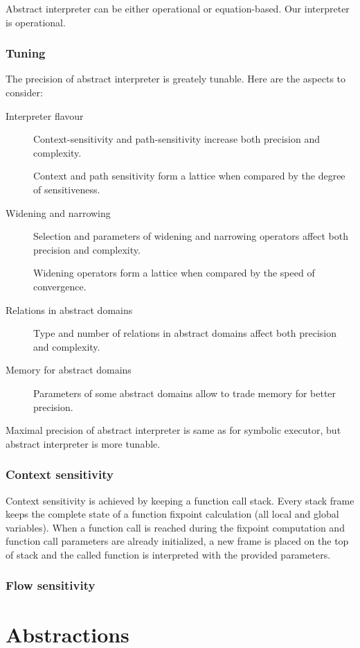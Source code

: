 \documentclass[a4paper]{book}
\begin{document}
Abstract interpreter can be either operational or equation-based.  Our
interpreter is operational.

\subsection{Tuning}
The precision of abstract interpreter is greately tunable. Here are
the aspects to consider:
\begin{description}
\item[Interpreter flavour] Context-sensitivity and path-sensitivity
  increase both precision and complexity.

Context and path sensitivity form a lattice when compared by the
degree of sensitiveness.

\item[Widening and narrowing] Selection and parameters of widening and
  narrowing operators affect both precision and complexity.

Widening operators form a lattice when compared by the speed of
convergence.

\item[Relations in abstract domains] Type and number of relations in
  abstract domains affect both precision and complexity.
\item[Memory for abstract domains] Parameters of some abstract domains
  allow to trade memory for better precision.
\end{description}

Maximal precision of abstract interpreter is same as for symbolic
executor, but abstract interpreter is more tunable.

\subsection{Context sensitivity}
Context sensitivity is achieved by keeping a function call stack.
Every stack frame keeps the complete state of a function fixpoint
calculation (all local and global variables).  When a function call is
reached during the fixpoint computation and function call parameters
are already initialized, a new frame is placed on the top of stack and
the called function is interpreted with the provided parameters.

\subsection{Flow sensitivity}


\chapter{Abstractions}
\end{document}
